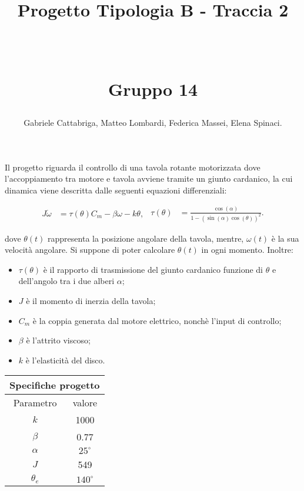 \documentclass[a4paper, 11pt]{article}
\title{ \vspace{-1in}
		\huge \strut \coursename \strut 
		\\
		\Large  \strut Progetto Tipologia B - Traccia 2
		\\
		\Large  \strut \projectname\strut
		\\
		\Large  \strut Gruppo 14\strut
		\vspace{-0.4cm}
}
\author{Gabriele Cattabriga, Matteo Lombardi, Federica Massei, Elena Spinaci.}
\date{}
\begin{document}
\maketitle
\vspace{-0.5cm}
Il progetto riguarda il controllo di una tavola rotante motorizzata dove l'accoppiamento tra motore e tavola avviene tramite un giunto cardanico, la cui dinamica viene descritta dalle seguenti equazioni differenziali: 

\begin{subequations}\label{eq:system}
\begin{align}
	J\dot{\omega} &= \tau (\theta)C_m - \beta \omega - k\theta,
\end{align}
\begin{align}
    \tau (\theta) &= \frac{\cos(\alpha)}{1-(\sin(\alpha)\cos(\theta))^2}.
\end{align}
\end{subequations}


dove $\theta(t)$ rappresenta la posizione angolare della tavola, mentre, $\omega(t)$ è la sua velocità angolare. Si suppone di poter calcolare $\theta(t)$ in ogni momento. Inoltre:
\begin{itemize}
    \item \textbf{$\tau(\theta)$} è il rapporto di trasmissione del giunto cardanico funzione di $\theta$ e dell'angolo tra i due alberi $\alpha$;
    \item \textbf{$J$} è il momento di inerzia della tavola;
    \item \textbf{$C_m$} è la coppia generata dal motore elettrico, nonchè l'input di controllo;
    \item \textbf{$\beta$} è l'attrito viscoso;
    \item \textbf{$k$} è l'elasticità del disco.
\end{itemize}

\begin{center}
    \begin{tabular}{|c|c|}
    \multicolumn{2}{c}{\textbf{Specifiche progetto}} \\
    \hline
        Parametro & valore \\
    \hline
        $k$ & 1000 \\
        $\beta$ & 0.77 \\
        $\alpha$ & $25^\circ$ \\
        $J$ & 549 \\
        $\theta_e$ & $140^\circ$ \\
    \hline
    \end{tabular}
\end{center}
\end{document}
